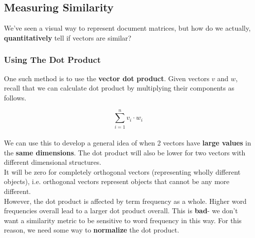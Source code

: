 \documentclass[english, 10pt]{article}
\begin{document}
{


}


\subsection{Measuring Similarity}

We've seen a visual way to represent document matrices, but how do we actually, \textbf{quantitatively} tell if vectors are similar?

\subsubsection{Using The Dot Product}

One such method is to use the \textbf{vector dot product}. Given vectors $v$ and $w$, recall that we can calculate dot product by multiplying their components as follows.

$$\sum_{i=1}^{n}{v_i \cdot w_i}$$\\

We can use this to develop a general idea of when 2 vectors have \textbf{large values} in the \textbf{same dimensions}. The dot product will also be lower for two vectors with different dimensional structures.\\

It will be zero for completely orthogonal vectors (representing wholly different objects), i.e. orthogonal vectors represent objects that cannot be any more different.\\

However, the dot product is affected by term frequency as a whole. Higher word frequencies overall lead to a larger dot product overall. This is \textbf{bad}- we don't want a similarity metric to be sensitive to word frequency in this way. For this reason, we need some way to \textbf{normalize} the dot product.\\
\end{document}
